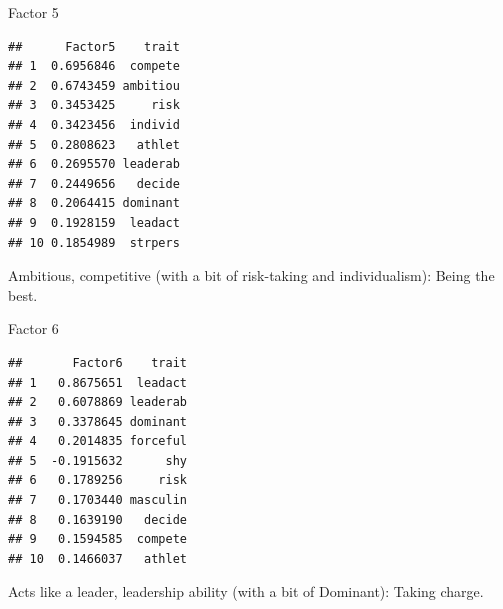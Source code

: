 \documentclass[ignorenonframetext,]{beamer}
\newenvironment{Shaded}{\begin{snugshade}}{\end{snugshade}}
\newcommand{\DecValTok}[1]{\textcolor[rgb]{0.00,0.00,0.81}{#1}}
\newcommand{\KeywordTok}[1]{\textcolor[rgb]{0.13,0.29,0.53}{\textbf{#1}}}
\newcommand{\NormalTok}[1]{#1}
\newcommand{\OperatorTok}[1]{\textcolor[rgb]{0.81,0.36,0.00}{\textbf{#1}}}
\newcommand{\StringTok}[1]{\textcolor[rgb]{0.31,0.60,0.02}{#1}}
\begin{document}
\begin{frame}[fragile]{Factor 5}
\protect\hypertarget{factor-5}{}

\footnotesize

\begin{Shaded}
\end{Shaded}

\begin{verbatim}
##      Factor5    trait
## 1  0.6956846  compete
## 2  0.6743459 ambitiou
## 3  0.3453425     risk
## 4  0.3423456  individ
## 5  0.2808623   athlet
## 6  0.2695570 leaderab
## 7  0.2449656   decide
## 8  0.2064415 dominant
## 9  0.1928159  leadact
## 10 0.1854989  strpers
\end{verbatim}

\normalsize

Ambitious, competitive (with a bit of risk-taking and individualism):
Being the best.

\end{frame}

\begin{frame}[fragile]{Factor 6}
\protect\hypertarget{factor-6}{}

\footnotesize

\begin{Shaded}
\end{Shaded}

\begin{verbatim}
##       Factor6    trait
## 1   0.8675651  leadact
## 2   0.6078869 leaderab
## 3   0.3378645 dominant
## 4   0.2014835 forceful
## 5  -0.1915632      shy
## 6   0.1789256     risk
## 7   0.1703440 masculin
## 8   0.1639190   decide
## 9   0.1594585  compete
## 10  0.1466037   athlet
\end{verbatim}

\normalsize

Acts like a leader, leadership ability (with a bit of Dominant): Taking
charge.

\end{frame}
\end{document}
